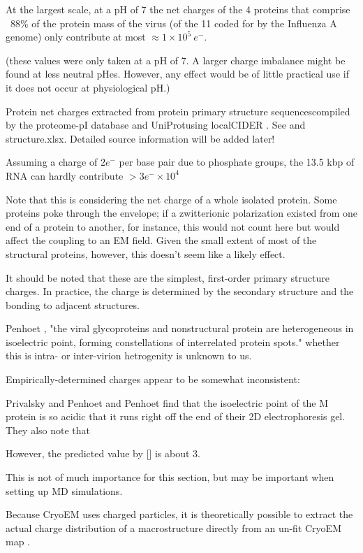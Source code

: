 \documentclass[paper.tex]{subfiles}
\begin{document}
At the largest scale, at a pH of 7 the net charges of the 4 proteins that comprise ~88\% of the protein mass\cite{Quantitative1981} of the virus (of the 11 coded for by the Influenza A genome) only contribute at most  $\approx 1 \times 10^5\  e^-$.









(these values were only taken at a pH of 7. A larger charge imbalance might be found at less neutral pHes. However, any effect would be of little practical use if it does not occur at physiological pH.)

\begin{sidenote}
Protein net charges extracted from protein primary structure sequences\footnotemark compiled by the proteome-pI database \cite{ProteomepI2017} and UniProt\footnotemark using localCIDER \cite{CIDER2017}. See  and structure.xlsx. Detailed source information will be added later!
\end{sidenote}
Assuming a charge of $2e^-$ per base pair due to phosphate groups, the 13.5 kbp of RNA can hardly contribute $> 3e^- \times10^4$


Note that this is considering the net charge of a whole isolated protein. Some proteins poke through the envelope; if a zwitterionic polarization existed from one end of a protein to another, for instance, this would not count here but would affect the coupling to an EM field. Given the small extent of most of the structural proteins, however, this doesn't seem like a likely effect.

\begin{sidenote}
	It should be noted that these are the simplest, first-order primary structure charges. In practice, the charge is determined by the secondary structure and the bonding to adjacent structures.
	
	 Penhoet \cite{Structurea}, "the viral glycoproteins and nonstructural protein are heterogeneous in isoelectric point, forming constellations of interrelated protein spots." whether this is intra- or inter-virion hetrogenity is unknown to us. 
	
	Empirically-determined charges appear to be somewhat inconsistent:
	
	Privalsky and Penhoet \cite{Influenza1978} and Penhoet \cite{Structurea} find that the isoelectric point of the M protein is so acidic that it runs right off the end of their 2D electrophoresis gel. They also note that 
	
	However, the predicted value by [] is about 3.
	
	This is not of much importance for this section, but may be important when setting up MD simulations.
	
	Because CryoEM uses charged particles, it is theoretically possible to extract the actual charge distribution of a macrostructure directly from an un-fit CryoEM map \cite{Identification2018}. 
\end{sidenote}
\end{document}
